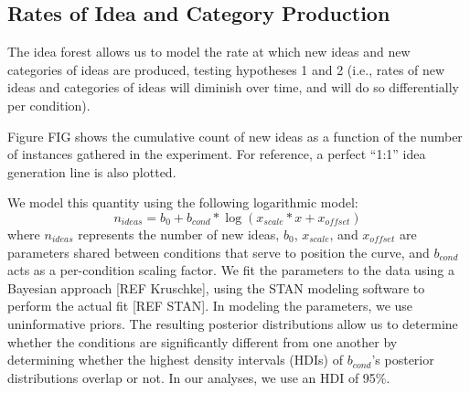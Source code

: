 


\subsection{Rates of Idea and Category Production}
The idea forest allows us to model the rate at which new ideas and new categories of ideas are produced, testing hypotheses 1 and 2 (i.e., rates of new ideas and categories of ideas will diminish over time, and will do so differentially per condition).

Figure FIG shows the cumulative count of new ideas as a function of the number of instances gathered in the experiment. For reference, a perfect ``1:1'' idea generation line is also plotted.

We model this quantity using the following logarithmic model:
\[n_{ideas} = b_0 + b_{cond} * \log (x_{scale} * x + x_{offset})\]
where $n_{ideas}$ represents the number of new ideas, $b_0$, $x_{scale}$, and $x_{offset}$ are parameters shared between conditions that serve to position the curve, and $b_{cond}$ acts as a per-condition scaling factor. We fit the parameters to the data using a Bayesian approach [REF Kruschke], using the STAN modeling software to perform the actual fit [REF STAN]. In modeling the parameters, we use uninformative priors. The resulting posterior distributions allow us to determine whether the conditions are significantly different from one another by determining whether the highest density intervals (HDIs) of $b_{cond}$'s posterior distributions overlap or not. In our analyses, we use an HDI of 95\%.

